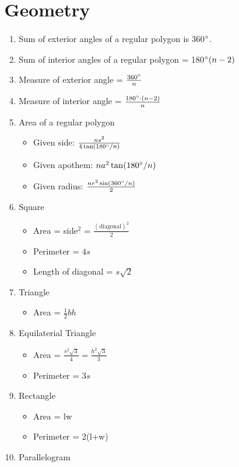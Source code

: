\documentclass[../uilmath.tex]{subfiles}
\begin{document}
\section*{Geometry}
\begin{enumerate}
    \item Sum of exterior angles of a regular polygon is 360$\degree$.
    \item Sum of interior angles of a regular polygon = 180$\degree(n-2)$
    \item Measure of exterior angle = $\frac{360\degree}{n}$
    \item Measure of interior angle = $\frac{180\degree \cdot (n-2)}{n}$
    \item Area of a regular polygon 
    \begin{itemize}
        \item Given side: $\frac{ns^2}{4\tan(180\degree/n)}$
        \item Given apothem: $na^2\tan(180\degree/n)$
        \item Given radius: $\frac{nr^2\sin(360\degree/n)}{2}$
    \end{itemize}
    \item Square 
    \begin{itemize}
        \item Area = side$^2$ = $\frac{(\text{diagonal})^2}{2}$
        \item Perimeter = $4s$
        \item Length of diagonal = $s\sqrt{2}$
    \end{itemize}
    \item Triangle 
    \begin{itemize}
        \item Area = $\frac{1}{2}bh$
    \end{itemize}
    \item Equilaterial Triangle 
    \begin{itemize}
        \item Area = $\frac{s^2\sqrt{3}}{4}=\frac{h^2\sqrt{3}}{3}$
        \item Perimeter = $3s$
    \end{itemize}
    \item Rectangle 
    \begin{itemize}
        \item Area = lw 
        \item Perimeter = 2(l+w)
    \end{itemize}
    \item Parallelogram 

\end{enumerate}
\end{document}
